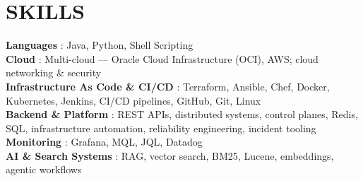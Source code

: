 \documentclass[letterpaper,11pt]{article}
\begin{document}
\section{SKILLS}
\begin{itemize}[leftmargin=0in, label={}]
    \small{\item{
     \textbf{Languages} {: Java, Python, Shell Scripting} \\
     \textbf{Cloud} {: Multi-cloud --- Oracle Cloud Infrastructure (OCI), AWS; cloud networking \& security} \\
     \textbf{Infrastructure As Code \& CI/CD} {: Terraform, Ansible, Chef, Docker, Kubernetes, Jenkins, CI/CD pipelines, GitHub, Git, Linux} \\
     \textbf{Backend \& Platform} {: REST APIs, distributed systems, control planes, Redis, SQL, infrastructure automation, reliability engineering, incident tooling} \\
     \textbf{Monitoring} {: Grafana, MQL, JQL, Datadog} \\
     \textbf{AI \& Search Systems} {: RAG, vector search, BM25, Lucene, embeddings, agentic workflows}
    }}
\end{itemize}

\end{document}
